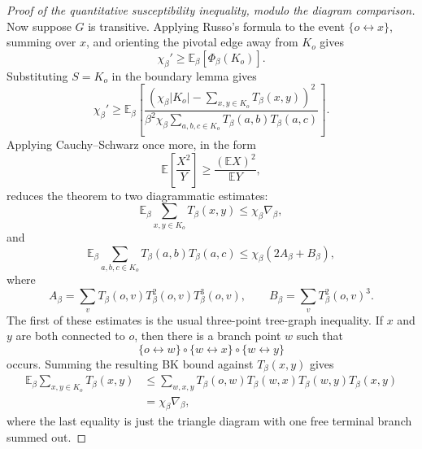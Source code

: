 \documentclass[11pt,reqno]{book}
\numberwithin{equation}{chapter}
\theoremstyle{plain}
\theoremstyle{definition}
\theoremstyle{remark}
\newcommand{\E}{\mathbb E}
\newcommand{\1}{\mathbf 1}
\begin{document}
\begin{proof}[Proof of the quantitative susceptibility inequality, modulo the diagram comparison]
Now suppose \(G\) is transitive. Applying Russo's formula to the event \(\{o\leftrightarrow x\}\), summing over \(x\), and orienting the pivotal edge away from \(K_o\) gives
\[
  \chi_\beta'
  \geq
  \E_\beta[\Phi_\beta(K_o)].
\]
Substituting \(S=K_o\) in the boundary lemma gives
\[
  \chi_\beta'
  \geq
  \E_\beta\left[
  \frac{
    \left(\chi_\beta|K_o|-\sum_{x,y\in K_o}T_\beta(x,y)\right)^2
  }{
    \beta^2\chi_\beta
    \sum_{a,b,c\in K_o}T_\beta(a,b)T_\beta(a,c)
  }
  \right].
\]
Applying Cauchy--Schwarz once more, in the form
\[
  \E\left[\frac{X^2}{Y}\right]\geq \frac{(\E X)^2}{\E Y},
\]
reduces the theorem to two diagrammatic estimates:
\[
  \E_\beta\sum_{x,y\in K_o}T_\beta(x,y)\leq \chi_\beta\nabla_\beta,
\]
and
\[
  \E_\beta\sum_{a,b,c\in K_o}T_\beta(a,b)T_\beta(a,c)
  \leq
  \chi_\beta(2A_\beta+B_\beta),
\]
where
\[
  A_\beta=\sum_v T_\beta(o,v)T_\beta^2(o,v)T_\beta^3(o,v),
  \qquad
  B_\beta=\sum_v T_\beta^2(o,v)^3.
\]
The first of these estimates is the usual three-point tree-graph inequality.
If \(x\) and \(y\) are both connected to \(o\), then there is a branch point
\(w\) such that
\[
  \{o\leftrightarrow w\}\circ\{w\leftrightarrow x\}\circ\{w\leftrightarrow y\}
\]
occurs. Summing the resulting BK bound against \(T_\beta(x,y)\) gives
\[
\begin{aligned}
  \E_\beta\sum_{x,y\in K_o}T_\beta(x,y)
  &\leq
  \sum_{w,x,y}
  T_\beta(o,w)T_\beta(w,x)T_\beta(w,y)T_\beta(x,y)  \\
  &=
  \chi_\beta\nabla_\beta,
\end{aligned}
\]
where the last equality is just the triangle diagram with one free terminal
branch summed out.


\end{proof}
\end{document}
